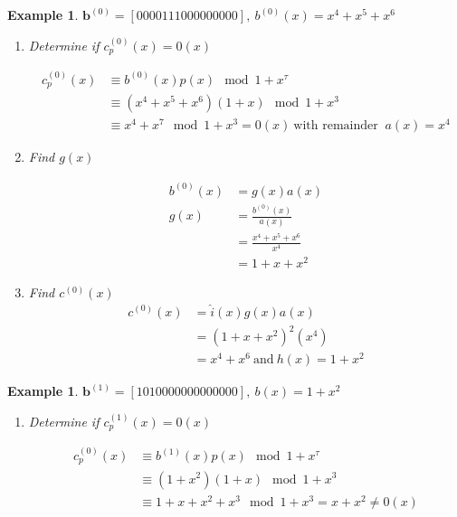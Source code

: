 \documentclass[twocolumn]{article}
\newtheorem{example}[theorem]{Example}
\begin{document}
\begin{example}
\label{ex1}
$\textbf{b}^{(0)}=[ 0 0 0 0 1 1 1 0 0 0 0 0 0 0 0 0],~b^{(0)}(x)=x^4+x^5+x^6$

\begin{enumerate}
\item Determine if $c_p^{(0)}(x) =0(x)$

\begin{equation*}
\begin{split}
c_p^{(0)}(x)& \equiv b^{(0)}(x)p(x) \mod{1+x^{\tau}}\\
& \equiv (x^4+x^5+x^6)(1+x)  \mod{1+x^{3}}\\
&\equiv x^4+x^7  \mod{1+x^{3}} =0(x) ~\text{with remainder }~ a(x) =x^4
\end{split}
\end{equation*}

\item Find $g(x)$
 
 \begin{equation*}
 \begin{split}
 b^{(0)}(x)&=g(x)a(x) \\
 g(x) &=\frac{b^{(0)}(x)}{a(x)}\\
 &=\frac{x^4+x^5+x^6}{x^4}\\
 &=1+x+x^2
 \end{split}
 \end{equation*}
 
 \item Find $c^{(0)}(x)$
 \begin{equation*}
 \begin{split}
 c^{(0)}(x)&=\hat{i}(x)g(x)a(x) \\
 &=(1+x+x^2)^2(x^4)\\
 &=x^4+x^6 ~\text{and}~ h(x)=1+x^2 
 \end{split}
 \end{equation*}
 
\end{enumerate}
\end{example}

\begin{example}
\label{ex2}
$\textbf{b}^{(1)}=[ 1 0 1 0 0 0 0 0 0 0 0 0 0 0 0 0 ],~ b(x)=1+x^2$

\begin{enumerate}
\item Determine if $c_p^{(1)}(x) =0(x)$

\begin{equation*}
\begin{split}
c_p^{(0)}(x)& \equiv b^{(1)}(x)p(x) \mod{1+x^{\tau}}\\
& \equiv (1+x^2)(1+x)  \mod{1+x^{3}}\\
&\equiv 1+x+x^2+x^3  \mod{1+x^{3}} =x+x^2 \neq 0(x)
\end{split}
\end{equation*}
\end{enumerate}
\end{example}
 
\end{document}
